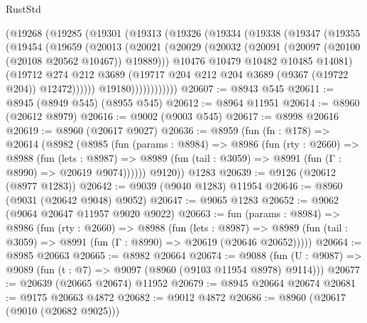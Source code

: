 \begin{lexlean}{RustStd}
\begin{coremodule}
          (@19268
            (@19285
              (@19301
                (@19313
                  (@19326
                    (@19334
                      (@19338
                        (@19347
                          (@19355
                            (@19454
                              (@19659
                                (@20013
                                  (@20021
                                    (@20029
                                      (@20032
                                        (@20091 (@20097 (@20100 (@20108 @20562 @10467)) @19889)))
                                      @10476
                                      @10479
                                      @10482
                                      @10485
                                      @14081)
                                    (@19712
                                      @274
                                      @212
                                      @3689
                                      (@19717
                                        @204
                                        @212
                                        @204
                                        @3689
                                        (@9367 (@19722 @204))
                                        @12472))))))
                            @19180))))))))))))
@20607 := @8943 @545
@20611 := @8945 (@8949 @545) (@8955 @545)
@20612 := @8964 @11951
@20614 := @8960 (@20612 @8979)
@20616 := @9002 (@9003 @545)
@20617 := @8998 @20616
@20619 := @8960 (@20617 @9027)
@20636 := @8959
    (fun (fn : @178) =>
    @20614
      (@8982
        (@8985
          (fun (params : @8984) =>
          @8986
            (fun (rty : @2660) =>
            @8988
              (fun (lets : @8987) =>
              @8989 (fun (tail : @3059) => @8991 (fun (Γ : @8990) => @20619 @9074))))))
        @9120))
    @1283
@20639 := @9126 (@20612 (@8977 @1283))
@20642 := @9039 (@9040 @1283) @11954
@20646 := @8960 (@9031 (@20642 @9048) @9052)
@20647 := @9065 @1283
@20652 := @9062 (@9064 @20647 @11957 @9020 @9022)
@20663 := fun (params : @8984) =>
  @8986
    (fun (rty : @2660) =>
    @8988
      (fun (lets : @8987) =>
      @8989 (fun (tail : @3059) => @8991 (fun (Γ : @8990) => @20619 (@20646 @20652)))))
@20664 := @8985 @20663
@20665 := @8982 @20664
@20674 := @9088
    (fun (U : @9087) => @9089 (fun (t : @7) => @9097 (@8960 (@9103 @11954 @8978) @9114)))
@20677 := @20639 (@20665 @20674) @11952
@20679 := @8945 @20664 @20674
@20681 := @9175 @20663 @4872
@20682 := @9012 @4872
@20686 := @8960 (@20617 (@9010 (@20682 @9025)))

\end{coremodule}
\end{lexlean}
